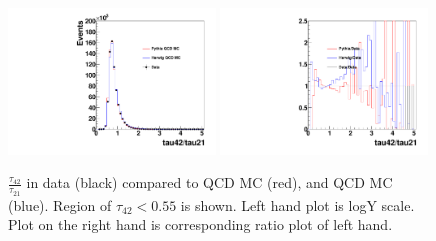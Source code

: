 \begin{figure}[htb]
\begin{center}
\includegraphics[width=0.49\textwidth,angle=0]{EXO-14-009/figs/SFExtra/SFSameJetRatioPlot55H.pdf}
\includegraphics[width=0.49\textwidth,angle=0]{EXO-14-009/figs/SFExtra/SFRatioRatioPlot55H.pdf}
\end{center}
\caption{
$\frac{\tau_{42}}{\tau_{21}}$ in data (black) compared to \PYTHIA QCD MC (red), and 
\HERWIG QCD MC (blue). Region of $\tau_{42} < 0.55$ is shown. 
Left hand plot is logY scale. Plot on the right hand is corresponding 
ratio plot of left hand.  
}
\label{fig:tau4221samejetH}
\end{figure}

